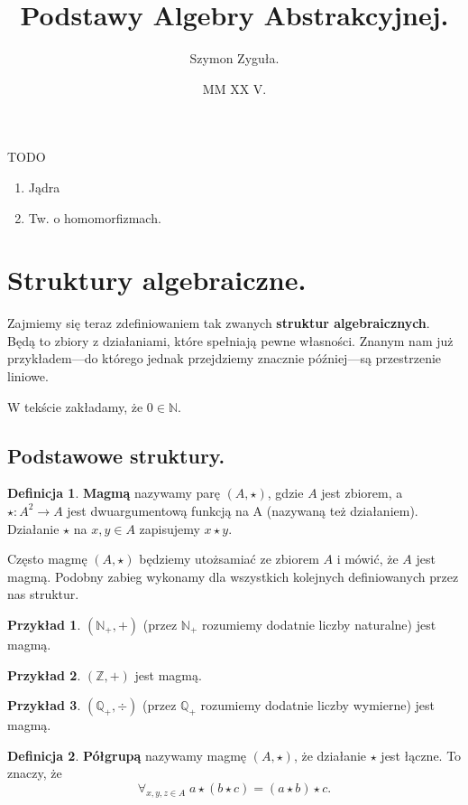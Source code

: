 \documentclass{article}
\date{MM XX V.}
\author{Szymon Zyguła.}
\title{Podstawy Algebry Abstrakcyjnej.}
\theoremstyle{definition}
\newtheorem{definition}{Definicja}[section]
\newtheorem{example}{Przykład}[section]
\begin{document}
\maketitle

TODO
\begin{enumerate}
	\item Jądra
	\item Tw. o homomorfizmach.
\end{enumerate}

\section{Struktury algebraiczne.}

Zajmiemy się teraz zdefiniowaniem tak zwanych \textbf{struktur algebraicznych}.
Będą to zbiory z działaniami, które spełniają pewne własności.
Znanym nam już przykładem{\mbox{---}}do którego jednak przejdziemy znacznie później---są przestrzenie liniowe.

W tekście zakładamy, że $0 \in \mathbb{N}$.

\subsection{Podstawowe struktury.}

\begin{definition}
	\textbf{Magmą} nazywamy parę $(A, \star)$, gdzie $A$ jest zbiorem, a $\star: A^2 \to A$ jest dwuargumentową funkcją na A (nazywaną też działaniem). Działanie $\star$ na $x, y \in A$ zapisujemy $x \star y$.
\end{definition}
Często magmę $(A, \star)$ będziemy utożsamiać ze zbiorem $A$ i mówić, że $A$ jest magmą.
Podobny zabieg wykonamy dla wszystkich kolejnych definiowanych przez nas struktur.

\begin{example}
	$(\mathbb{N}_+, +)$ (przez $\mathbb{N}_+$ rozumiemy dodatnie liczby naturalne) jest magmą.
\end{example}

\begin{example}
	$(\mathbb{Z}, +)$ jest magmą.
\end{example}

\begin{example}
	$(\mathbb{Q}_+, \div)$ (przez $\mathbb{Q}_+$ rozumiemy dodatnie liczby wymierne) jest magmą.
\end{example}

\begin{definition}
	\textbf{Półgrupą} nazywamy magmę $(A, \star)$, że działanie $\star$ jest łączne. To znaczy, że
	\begin{equation*}
		\forall_{x,y,z \in A}\; a \star (b \star c) = (a \star b) \star c.
	\end{equation*}
\end{definition}
\end{document}
